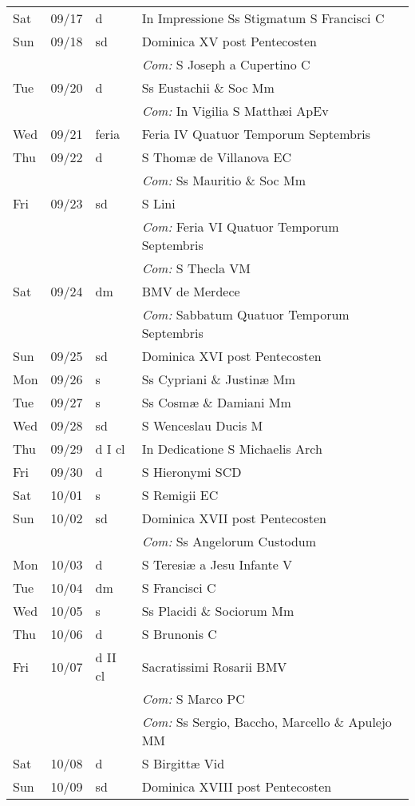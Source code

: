 \documentclass[10pt]{article}
\begin{document}
\begin{longtable}{ l l l l }
Sat & 09/17 & d & In Impressione Ss Stigmatum S Francisci C\\
Sun & 09/18 & sd & Dominica XV post Pentecosten\\
 & & & \textit{Com:} S Joseph a Cupertino C\\
Tue & 09/20 & d & Ss Eustachii \& Soc Mm\\
 & & & \textit{Com:} In Vigilia S Matthæi ApEv\\
Wed & 09/21 & feria & Feria IV Quatuor Temporum Septembris\\
Thu & 09/22 & d & S Thomæ de Villanova EC\\
 & & & \textit{Com:} Ss Mauritio \& Soc Mm\\
Fri & 09/23 & sd & S Lini\\
 & & & \textit{Com:} Feria VI Quatuor Temporum Septembris\\
 & & & \textit{Com:} S Thecla VM\\
Sat & 09/24 & dm & BMV de Merdece\\
 & & & \textit{Com:} Sabbatum Quatuor Temporum Septembris\\
Sun & 09/25 & sd & Dominica XVI post Pentecosten\\
Mon & 09/26 & s & Ss Cypriani \& Justinæ Mm\\
Tue & 09/27 & s & Ss Cosmæ \& Damiani Mm\\
Wed & 09/28 & sd & S Wenceslau Ducis M\\
Thu & 09/29 & d I cl & In Dedicatione S Michaelis Arch\\
Fri & 09/30 & d & S Hieronymi SCD\\
Sat & 10/01 & s & S Remigii EC\\
Sun & 10/02 & sd & Dominica XVII post Pentecosten\\
 & & & \textit{Com:} Ss Angelorum Custodum\\
Mon & 10/03 & d & S Teresiæ a Jesu Infante V\\
Tue & 10/04 & dm & S Francisci C\\
Wed & 10/05 & s & Ss Placidi \& Sociorum Mm\\
Thu & 10/06 & d & S Brunonis C\\
Fri & 10/07 & d II cl & Sacratissimi Rosarii BMV\\
 & & & \textit{Com:} S Marco PC\\
 & & & \textit{Com:} Ss Sergio, Baccho, Marcello \& Apulejo MM\\
Sat & 10/08 & d & S Birgittæ Vid\\
Sun & 10/09 & sd & Dominica XVIII post Pentecosten\\

\end{longtable}
\end{document}
